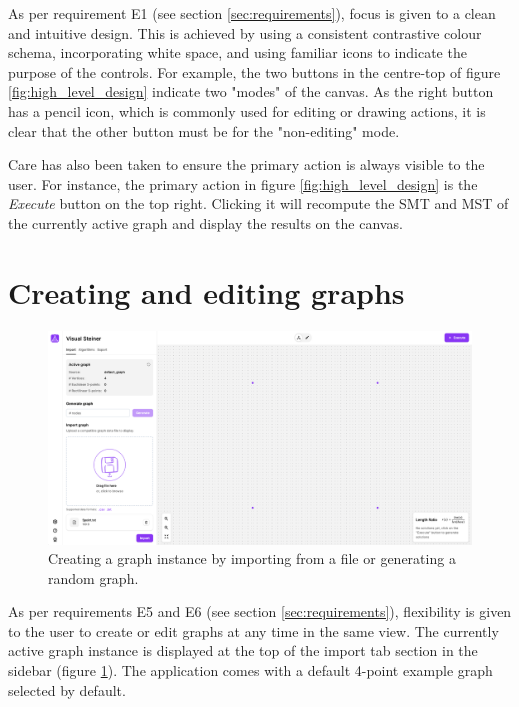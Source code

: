 \documentclass{l4proj}
\begin{document}
As per requirement E1 (see section \ref{sec:requirements}), focus is given to a clean and intuitive design. This is achieved by using a consistent contrastive colour schema, incorporating white space, and using familiar icons to indicate the purpose of the controls.
For example, the two buttons in the centre-top of figure \ref{fig:high_level_design} indicate two "modes" of the canvas. As the right button has a pencil icon, which is commonly used for editing or drawing actions, it is clear that the other button must be for the "non-editing" mode.

Care has also been taken to ensure the primary action is always visible to the user. For instance, the primary action in figure \ref{fig:high_level_design} is the \textit{Execute} button on the top right. Clicking it will recompute the SMT and MST of the currently active graph and display the results on the canvas.
\section{Creating and editing graphs}
\label{sec:creating_and_editing_graphs}

\begin{figure}[hp]
    \centering
    \begin{tcolorbox}[colframe=gray!20, colback=gray!5, boxrule=1pt, arc=0mm, boxsep=0pt, left=0pt, right=0pt, top=0pt, bottom=0pt]
        \includegraphics[width=\textwidth]{images/import_view.png}
    \end{tcolorbox}

    \caption{Creating a graph instance by importing from a file or generating a random graph.}
    \label{fig:creating_and_editing_graphs}
\end{figure}
As per requirements E5 and E6 (see section \ref{sec:requirements}), flexibility is given to the user to create or edit graphs at any time in the same view.
The currently active graph instance is displayed at the top of the import tab section in the sidebar (figure \ref{fig:creating_and_editing_graphs}).
The application comes with a default 4-point example graph selected by default.
\end{document}
